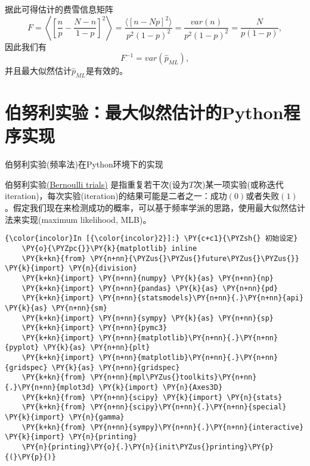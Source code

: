 据此可得估计的费雪信息矩阵
\begin{equation}
  \label{eq:mle-bernoulli-eistimate-information}
  F = \left\langle
  \left[
  \frac{n}{p} - \frac{N-n}{1-p}
  \right]^{2}
  \right\rangle
  = \frac{
  \langle
  \left[ n - Np \right]^{2}
  \rangle
  }{
  p^{2} \left( 1 - p \right)^{2}
  }
  = \frac{var (n)}{p^{2} \left(1-p \right)^{2}}
  = \frac{N}{p \left( 1 - p \right)},
\end{equation}
因此我们有
\begin{equation}
  \label{eq:mle-estimate-fisher-var}
  F^{-1} = var \left( \hat{p}_{ML} \right),
\end{equation}
并且最大似然估计$\hat{p}_{ML}$是有效的。

\section{伯努利实验：最大似然估计的Python程序实现}
\label{sec:mle-bernoulli-python}
伯努利实验(频率法)在Python环境下的实现

伯努利实验\href{https://en.wikipedia.org/wiki/Bernoulli_trial}{(Bernoulli
trials)}
是指重复若干次(设为\(T\)次)某一项实验(或称迭代iteration)，每次实验(iteration)的结果可能是二者之一：成功\((0)\)或者失败\((1)\)。假定我们现在来检测成功的概率，可以基于频率学派的思路，使用最大似然估计法来实现(maximum
likelihood, MLB)。

\begin{Verbatim}[commandchars=\\\{\}]
{\color{incolor}In [{\color{incolor}2}]:} \PY{c+c1}{\PYZsh{} 初始设定}
    \PY{o}{\PYZpc{}}\PY{k}{matplotlib} inline
    \PY{k+kn}{from} \PY{n+nn}{\PYZus{}\PYZus{}future\PYZus{}\PYZus{}} \PY{k}{import} \PY{n}{division}
    \PY{k+kn}{import} \PY{n+nn}{numpy} \PY{k}{as} \PY{n+nn}{np}
    \PY{k+kn}{import} \PY{n+nn}{pandas} \PY{k}{as} \PY{n+nn}{pd}
    \PY{k+kn}{import} \PY{n+nn}{statsmodels}\PY{n+nn}{.}\PY{n+nn}{api} \PY{k}{as} \PY{n+nn}{sm}
    \PY{k+kn}{import} \PY{n+nn}{sympy} \PY{k}{as} \PY{n+nn}{sp}
    \PY{k+kn}{import} \PY{n+nn}{pymc3}
    \PY{k+kn}{import} \PY{n+nn}{matplotlib}\PY{n+nn}{.}\PY{n+nn}{pyplot} \PY{k}{as} \PY{n+nn}{plt}
    \PY{k+kn}{import} \PY{n+nn}{matplotlib}\PY{n+nn}{.}\PY{n+nn}{gridspec} \PY{k}{as} \PY{n+nn}{gridspec}
    \PY{k+kn}{from} \PY{n+nn}{mpl\PYZus{}toolkits}\PY{n+nn}{.}\PY{n+nn}{mplot3d} \PY{k}{import} \PY{n}{Axes3D}
    \PY{k+kn}{from} \PY{n+nn}{scipy} \PY{k}{import} \PY{n}{stats}
    \PY{k+kn}{from} \PY{n+nn}{scipy}\PY{n+nn}{.}\PY{n+nn}{special} \PY{k}{import} \PY{n}{gamma}
    \PY{k+kn}{from} \PY{n+nn}{sympy}\PY{n+nn}{.}\PY{n+nn}{interactive} \PY{k}{import} \PY{n}{printing}
    \PY{n}{printing}\PY{o}{.}\PY{n}{init\PYZus{}printing}\PY{p}{(}\PY{p}{)}
\end{Verbatim}

